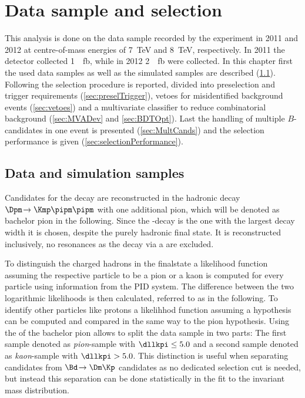 \chapter{Data sample and selection}

This analysis is done on the data sample recorded by the \lhcb experiment in \num{2011} and \num{2012} at centre-of-mass energies of \SI{7}{\tera\electronvolt} and \SI{8}{\tera\electronvolt}, respectively.
In \num{2011} the detector collected \SI{1}{\per\femto\barn}, while in \num{2012} \SI{2}{\per\femto\barn} were collected.
In this chapter first the used data samples as well as the simulated samples are described (\cref{sec:Samples}).
Following the selection procedure is reported, divided into preselection and trigger requirements (\cref{sec:preselTrigger}), vetoes for \eg misidentified background events (\cref{sec:vetoes}) and a multivariate classifier to reduce combinatorial background (\cref{sec:MVADev} and \cref{sec:BDTOpt}).
Last the handling of multiple $B$-candidates in one event is presented (\cref{sec:MultCands}) and the selection performance is given (\cref{sec:selectionPerformance}).

\section{Data and simulation samples}
\label{sec:Samples}

Candidates for the decay \BdToDpi are reconstructed in the hadronic decay $\Dpm\!\to\Kmp\pipm\pipm$ with one additional pion, which will be denoted as bachelor pion in the following.
Since the \D-decay is the one with the largest decay width it is chosen, despite the purely hadronic final state.
It is reconstructed inclusively, \ie no resonances as the decay via a \Kstarz are excluded.

To distinguish the charged hadrons in the finalstate a likelihood function assuming the respective particle to be a pion or a kaon is computed for every particle using information from the PID system.
The difference between the two logarithmic likelihoods is then calculated, referred to as \dllkpi in the following.
To identify other particles like protons a likelihhod function assuming a hypothesis can be computed and compared in the same way to the pion hypothesis.
Using the \dllkpi of the bachelor pion allows to split the data sample in two parts: The first sample denoted as \emph{pion}-sample with $\dllkpi\leq5.0$ and a second sample denoted as \emph{kaon}-sample with $\dllkpi>5.0$. This distinction is useful when separating \BdToDpi candidates from $\Bd\!\to\Dm\Kp$ candidates as no dedicated selection cut is needed, but instead this separation can be done statistically in the fit to the invariant mass distribution.

